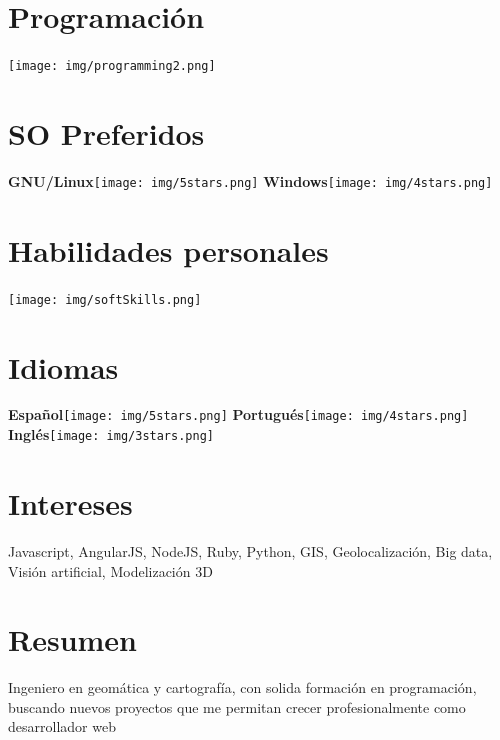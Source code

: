 \documentclass[]{friggeri-cv}
\begin{document}
\begin{aside}
  \section{Programación}
    \texttt{[image: img/programming2.png]}
    ~
  \section{SO Preferidos}
    \textbf{GNU/Linux}\texttt{[image: img/5stars.png]}
    \textbf{Windows}\texttt{[image: img/4stars.png]}
    ~
  \section{Habilidades personales}
    \texttt{[image: img/softSkills.png]}
    ~
  \section{Idiomas}
    \textbf{Español}\texttt{[image: img/5stars.png]}
    \textbf{Portugués}\texttt{[image: img/4stars.png]}
    \textbf{Inglés}\texttt{[image: img/3stars.png]}
\end{aside}

\section{Intereses}

Javascript, AngularJS, NodeJS, Ruby, Python, GIS, Geolocalización, Big data, Visión artificial, Modelización 3D

\section{Resumen}
Ingeniero en geomática y cartografía, con solida formación en programación, buscando nuevos proyectos que me permitan crecer profesionalmente como desarrollador web

\end{document}
